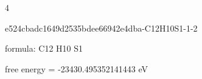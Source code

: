 \documentclass{article}
\begin{document}
4

\vspace{1cm}


e524cbadc1649d2535bdee66942e4dba-C12H10S1-1-2



formula: C12 H10 S1



free energy = -23430.495352141443 eV
\end{document}
